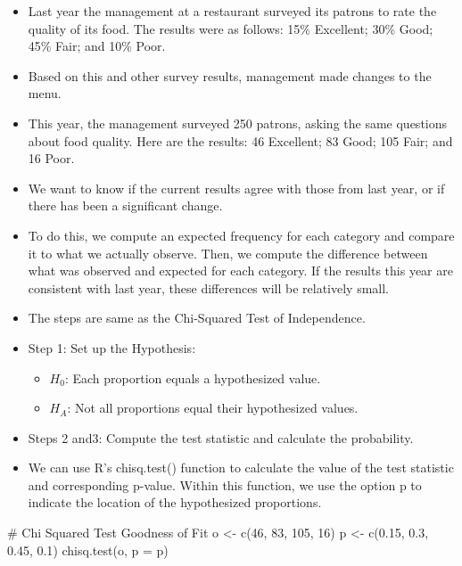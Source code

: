 \documentclass[
  letterpaper,
  DIV=11,
  numbers=noendperiod]{scrreprt}
\newenvironment{Shaded}{\begin{snugshade}}{\end{snugshade}}
\newcommand{\AttributeTok}[1]{\textcolor[rgb]{0.40,0.45,0.13}{#1}}
\newcommand{\CommentTok}[1]{\textcolor[rgb]{0.37,0.37,0.37}{#1}}
\newcommand{\DecValTok}[1]{\textcolor[rgb]{0.68,0.00,0.00}{#1}}
\newcommand{\FloatTok}[1]{\textcolor[rgb]{0.68,0.00,0.00}{#1}}
\newcommand{\FunctionTok}[1]{\textcolor[rgb]{0.28,0.35,0.67}{#1}}
\newcommand{\NormalTok}[1]{\textcolor[rgb]{0.00,0.23,0.31}{#1}}
\newcommand{\OtherTok}[1]{\textcolor[rgb]{0.00,0.23,0.31}{#1}}
\providecommand{\tightlist}{%
  \setlength{\itemsep}{0pt}\setlength{\parskip}{0pt}}\usepackage{longtable,booktabs,array}
\begin{document}
\begin{itemize}
\item
  Last year the management at a restaurant surveyed its patrons to rate
  the quality of its food. The results were as follows: 15\% Excellent;
  30\% Good; 45\% Fair; and 10\% Poor.
\item
  Based on this and other survey results, management made changes to the
  menu.
\item
  This year, the management surveyed 250 patrons, asking the same
  questions about food quality. Here are the results: 46 Excellent; 83
  Good; 105 Fair; and 16 Poor.
\item
  We want to know if the current results agree with those from last
  year, or if there has been a significant change.
\item
  To do this, we compute an expected frequency for each category and
  compare it to what we actually observe. Then, we compute the
  difference between what was observed and expected for each category.
  If the results this year are consistent with last year, these
  differences will be relatively small.
\item
  The steps are same as the Chi-Squared Test of Independence.
\item
  Step 1: Set up the Hypothesis:

  \begin{itemize}
  \tightlist
  \item
    \(𝐻_0\): Each proportion equals a hypothesized value.
  \item
    \(𝐻_A\): Not all proportions equal their hypothesized values.
  \end{itemize}
\item
  Steps 2 and3: Compute the test statistic and calculate the
  probability.
\item
  We can use R's chisq.test() function to calculate the value of the
  test statistic and corresponding p-value. Within this function, we use
  the option p to indicate the location of the hypothesized proportions.
\end{itemize}

\begin{Shaded}
\begin{Highlighting}[]
\CommentTok{\# Chi Squared Test Goodness of Fit}
\NormalTok{o }\OtherTok{\textless{}{-}} \FunctionTok{c}\NormalTok{(}\DecValTok{46}\NormalTok{, }\DecValTok{83}\NormalTok{, }\DecValTok{105}\NormalTok{, }\DecValTok{16}\NormalTok{)}
\NormalTok{p }\OtherTok{\textless{}{-}} \FunctionTok{c}\NormalTok{(}\FloatTok{0.15}\NormalTok{, }\FloatTok{0.3}\NormalTok{, }\FloatTok{0.45}\NormalTok{, }\FloatTok{0.1}\NormalTok{)}
\FunctionTok{chisq.test}\NormalTok{(o, }\AttributeTok{p =}\NormalTok{ p)}
\end{Highlighting}
\end{Shaded}
\end{document}
